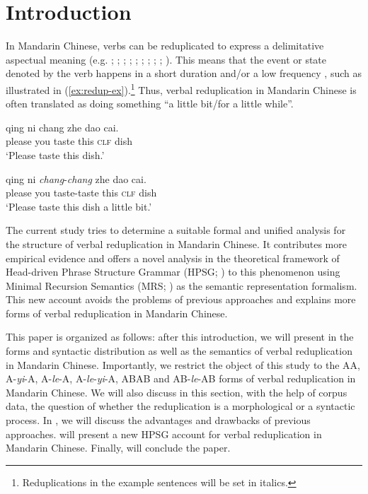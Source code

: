 \section{Introduction}\label{sec:intro}

In Mandarin Chinese, verbs can be reduplicated to express a delimitative aspectual meaning (e.g. \citealt[204--205]{Chao1968}; \citealt[232]{LiThompson1981};  \citealt[14]{Li1996}; \citealt[70]{Dai1997};  \citealt[382--383]{Zhu1998}; \citealt[420--421]{Xing2000}; \citealt[48]{Chen2001};  \citealt[288]{Tsao2001}; \citealt[11--12]{Yang2003}; \citealt[Sec. 4.3]{XiaoMcEnery2004}). 
This means that the event or state denoted by the verb happens in a short duration and/or a low frequency \citep[155]{XiaoMcEnery2004}, such as illustrated in (\ref{ex:redup-ex}).\footnote{Reduplications
    in the example sentences will be set in italics.}
Thus, verbal reduplication in Mandarin Chinese is often translated as doing something ``a little bit/for a little while''.

\ea\label{ex:redup-ex} 
	\ea
	\gll qing ni chang zhe dao cai.\\
	please you taste this \textsc{clf} dish\\
	\glt `Please taste this dish.'
	
	\ex
	\gll qing ni \textit{chang}-\textit{chang} zhe dao cai.\\
	please you taste-taste this \textsc{clf} dish\\
	\glt `Please taste this dish a little bit.' 
	\z
\z

The current study tries to determine a suitable formal and unified analysis for the structure of verbal reduplication in Mandarin Chinese.
It contributes more empirical evidence and 
offers a novel analysis in the theoretical framework of Head-driven Phrase Structure Grammar (HPSG; \citealt{PollardSag1994, Sag1997, HPSGHandbook}) to this phenomenon 
using Minimal Recursion Semantics (MRS; \citealt{Copestakeetal2005}) as the semantic representation formalism.
This new account avoids the problems of previous approaches and
explains more forms of verbal reduplication in Mandarin Chinese.

This paper is organized as follows: 
after this introduction, we will present in  the forms and syntactic distribution as well as the semantics of verbal reduplication in Mandarin Chinese. 
Importantly, we restrict the object of this study to the AA, A-\textit{yi}-A, A-\textit{le}-A, A-\textit{le}-\textit{yi}-A, ABAB and AB-\textit{le}-AB forms of verbal reduplication in Mandarin Chinese.
We will also discuss in this section, with the help of corpus data, the question of whether the reduplication is a morphological or a syntactic process.
In , we will discuss the advantages and drawbacks of previous approaches. 
 will present a new {HPSG} account for verbal reduplication in Mandarin Chinese.
Finally,   will conclude the paper.

